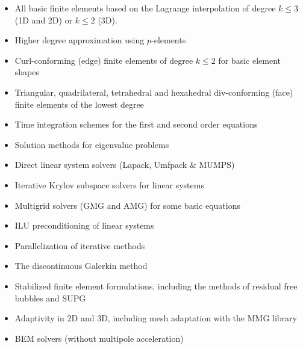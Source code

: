 \begin{itemize}
  \item All basic finite elements based on the Lagrange interpolation
of degree $k \le 3$ (1D and 2D) or $k \le 2$ (3D).
  \item Higher degree approximation using $p$-elements
  \item Curl-conforming (edge) finite elements of degree $k \le 2$ for basic element shapes
  \item Triangular, quadrilateral, tetrahedral and hexahedral div-conforming (face) finite elements of the lowest degree  
  \item Time integration schemes for the first and second order equations
  \item Solution methods for eigenvalue problems
  \item Direct linear system solvers (Lapack, Umfpack \& MUMPS)
  \item Iterative Krylov subspace solvers for linear systems
  \item Multigrid solvers (GMG and AMG) for some basic equations
  \item ILU preconditioning of linear systems
  \item Parallelization of iterative methods
  \item The discontinuous Galerkin method
  \item Stabilized finite element formulations, including the methods of residual free bubbles and SUPG
  \item Adaptivity in 2D and 3D, including mesh adaptation with the MMG library
  \item BEM solvers (without multipole acceleration)
\end{itemize}

